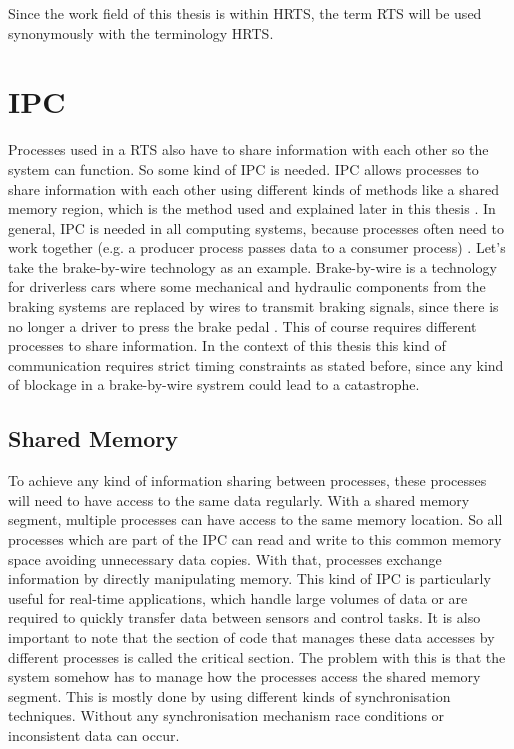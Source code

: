 Since the work field of this thesis is within \ac{HRTS}, the term \ac{RTS} will be used synonymously with the terminology \ac{HRTS}.

\section{\acf{IPC}}\label{sec:ipc}

Processes used in a \ac{RTS} also have to share information with each other so the system can function. So some kind of \ac{IPC} is needed. \ac{IPC} allows processes to share information with each other using different kinds of methods like a shared memory region, which is the method used and explained later in this thesis \cite{IPCMechanisms}. In general, \ac{IPC} is needed in all computing systems, because processes often need to work together (e.g. a producer process passes data to a consumer process) \cite{IPCMechanisms}. Let's take the brake-by-wire technology as an example. Brake-by-wire is a technology for driverless cars where some mechanical and hydraulic components from the braking systems are replaced by wires to transmit braking signals, since there is no longer a driver to press the brake pedal \cite{BrakeByWire}. This of course requires different processes to share information. In the context of this thesis this kind of communication requires strict timing constraints as stated before, since any kind of blockage in a brake-by-wire systrem could lead to a catastrophe.

\subsection{Shared Memory}\label{subsec:shared-memory}

To achieve any kind of information sharing between processes, these processes will need to have access to the same data regularly. With a shared memory segment, multiple processes can have access to the same memory location. So all processes which are part of the \ac{IPC} can read and write to this common memory space avoiding unnecessary data copies. With that, processes exchange information by directly manipulating memory. This kind of \ac{IPC} is particularly useful for real-time applications, which handle large volumes of data or are required to quickly transfer data between sensors and control tasks. It is also important to note that the section of code that manages these data accesses by different processes is called the critical section. The problem with this is that the system somehow has to manage how the processes access the shared memory segment. This is mostly done by using different kinds of synchronisation techniques. Without any synchronisation mechanism race conditions or inconsistent data can occur. \cite{sharedmem}

